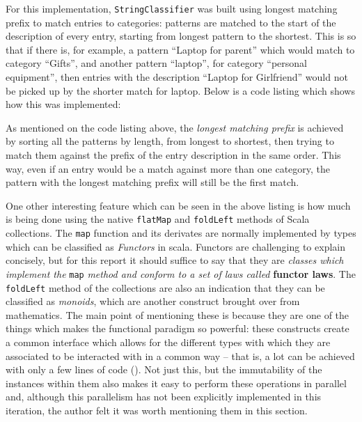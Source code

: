 For this implementation, \texttt{StringClassifier} was built using longest matching
prefix to match entries to categories: patterns are matched to the start of the
description of every entry, starting from longest pattern to the shortest. This
is so that if there is, for example, a pattern ``Laptop for parent'' which
would match to category ``Gifts'', and another pattern ``laptop'', for category
``personal equipment'', then entries with the description ``Laptop for
Girlfriend'' would not be picked up by the shorter match for laptop. Below is a
code listing which shows how this was implemented:
{
  \small
  
}

As mentioned on the code listing above, the \emph{longest matching prefix} is
achieved by sorting all the patterns by length, from longest to shortest, then
trying to match them against the prefix of the entry description in the same
order. This way, even if an entry would be a match against more than one
category, the pattern with the longest matching prefix will still be the first
match.

One other interesting feature which can be seen in the above listing is how
much is being done using the native \texttt{flatMap} and \texttt{foldLeft}
methods of Scala collections. The \texttt{map} function and its derivates are
normally implemented by types which can be classified as \emph{Functors} in
scala. Functors are challenging to explain concisely, but for this report it
should suffice to say that they are \emph{classes which implement the}
\texttt{map} \emph{method and conform to a set of laws called} \textbf{functor
laws}. The \texttt{foldLeft} method of the collections are also an indication
that they can be classified as \emph{monoids}, which are another construct
brought over from mathematics. The main point of mentioning these is because
they are one of the things which makes the functional paradigm so powerful:
these constructs create a common interface which allows for the different types
with which they are associated to be interacted with in a common way -- that
is, a lot can be achieved with only a few lines of code
(\cite[][Ch.~1,~Location~4243~\&~703]{nikolov2016scala}). Not just this, but
the immutability of the instances within them also makes it easy to perform
these operations in parallel and, although this parallelism has not been
explicitly implemented in this iteration, the author felt it was worth
mentioning them in this section.

